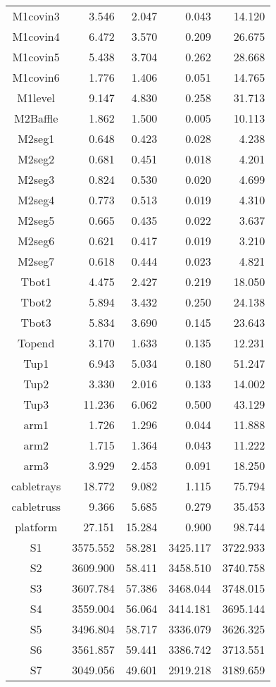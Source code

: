 \begin{longtable}{crrrr}
 M1covin3 & 3.546 & 2.047 & 0.043 & 14.120 \\
 M1covin4 & 6.472 & 3.570 & 0.209 & 26.675 \\
 M1covin5 & 5.438 & 3.704 & 0.262 & 28.668 \\
 M1covin6 & 1.776 & 1.406 & 0.051 & 14.765 \\
 M1level & 9.147 & 4.830 & 0.258 & 31.713 \\
 M2Baffle & 1.862 & 1.500 & 0.005 & 10.113 \\
 M2seg1 & 0.648 & 0.423 & 0.028 & 4.238 \\
 M2seg2 & 0.681 & 0.451 & 0.018 & 4.201 \\
 M2seg3 & 0.824 & 0.530 & 0.020 & 4.699 \\
 M2seg4 & 0.773 & 0.513 & 0.019 & 4.310 \\
 M2seg5 & 0.665 & 0.435 & 0.022 & 3.637 \\
 M2seg6 & 0.621 & 0.417 & 0.019 & 3.210 \\
 M2seg7 & 0.618 & 0.444 & 0.023 & 4.821 \\
 Tbot1 & 4.475 & 2.427 & 0.219 & 18.050 \\
 Tbot2 & 5.894 & 3.432 & 0.250 & 24.138 \\
 Tbot3 & 5.834 & 3.690 & 0.145 & 23.643 \\
 Topend & 3.170 & 1.633 & 0.135 & 12.231 \\
 Tup1 & 6.943 & 5.034 & 0.180 & 51.247 \\
 Tup2 & 3.330 & 2.016 & 0.133 & 14.002 \\
 Tup3 & 11.236 & 6.062 & 0.500 & 43.129 \\
 arm1 & 1.726 & 1.296 & 0.044 & 11.888 \\
 arm2 & 1.715 & 1.364 & 0.043 & 11.222 \\
 arm3 & 3.929 & 2.453 & 0.091 & 18.250 \\
 cabletrays & 18.772 & 9.082 & 1.115 & 75.794 \\
 cabletruss & 9.366 & 5.685 & 0.279 & 35.453 \\
 platform & 27.151 & 15.284 & 0.900 & 98.744 \\
 S1 & 3575.552 & 58.281 & 3425.117 & 3722.933 \\
 S2 & 3609.900 & 58.411 & 3458.510 & 3740.758 \\
 S3 & 3607.784 & 57.386 & 3468.044 & 3748.015 \\
 S4 & 3559.004 & 56.064 & 3414.181 & 3695.144 \\
 S5 & 3496.804 & 58.717 & 3336.079 & 3626.325 \\
 S6 & 3561.857 & 59.441 & 3386.742 & 3713.551 \\
 S7 & 3049.056 & 49.601 & 2919.218 & 3189.659 \\
\bottomrule
\end{longtable}

